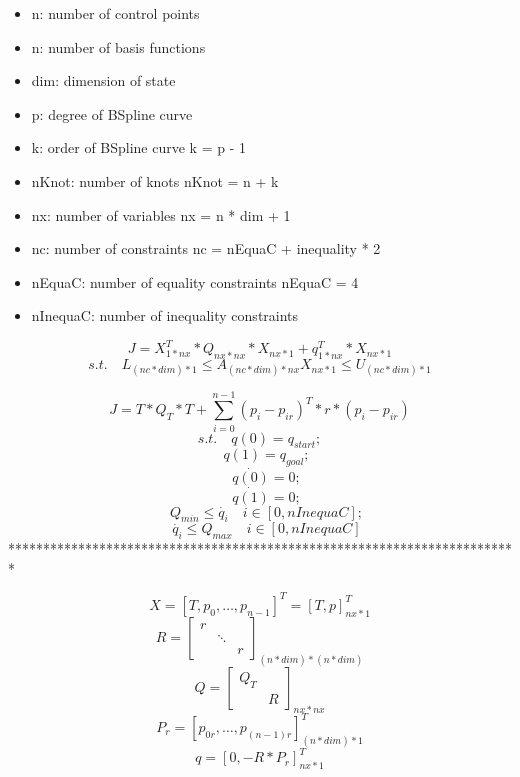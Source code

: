 \documentclass[]{article}
\begin{document}
  
\begin{itemize}
    \item[] n: number of control points 
    \item[] n: number of basis functions
    \item[] dim: dimension of state 
    \item[] p: degree of BSpline curve 
    \item[] k: order of BSpline curve k = p - 1
    \item[] nKnot: number of knots nKnot = n + k
    \item[] nx: number of variables nx = n * dim + 1
    \item[] nc: number of constraints nc = nEquaC + inequality * 2
    \item[] nEquaC: number of equality constraints nEquaC = 4
    \item[] nInequaC: number of inequality constraints
\end{itemize}


    \[ J = X^{T}_{1 * nx} * Q_{nx * nx} * X_{nx * 1} + q^{T}_{1 * nx} * X_{nx * 1} \]
    \[ s.t.\quad L_{(nc * dim) * 1} \leq A_{(nc * dim) * nx}X_{nx * 1} \leq U_{(nc * dim) * 1} \]

    \[ J = T * Q_{T} * T + \sum_{i = 0}^{n - 1}(p_{i} - p_{ir})^{T} * r * (p_{i} - p_{ir}) \]
    \[ s.t.\quad q(0) = q_{start}; \]
    \[ \quad q(1) = q_{goal}; \]
    \[ \quad \dot{q(0)} = 0; \]
    \[ \quad \dot{q(1)} = 0; \]
    \[ \quad Q_{min} \leq \dot{q_i} \quad i \in [0, nInequaC]; \] 
    \[ \quad \dot{q_i} \leq Q_{max} \quad i \in [0, nInequaC] \]   
    *************************************************************************

    \[X = [T, p_{0}, \ldots, p_{n - 1}]^{T} = [T, p]^{T}_{nx * 1} \]
    \[ R = \begin{bmatrix}
             r    &    & \\
             & \ddots  & \\
             &    &    r
    \end{bmatrix}_{(n * dim) * (n * dim)} \]
    \[ Q = \begin{bmatrix}
        Q_{T} & \\
         &    R   
    \end{bmatrix}_{nx * nx} \]
    \[ P_{r} = [p_{0r},\ldots,p_{(n - 1)r}]^{T}_{(n * dim) * 1} \]
    \[ q = [0, -R * P_{r}]^{T}_{nx * 1} \]
\end{document}
